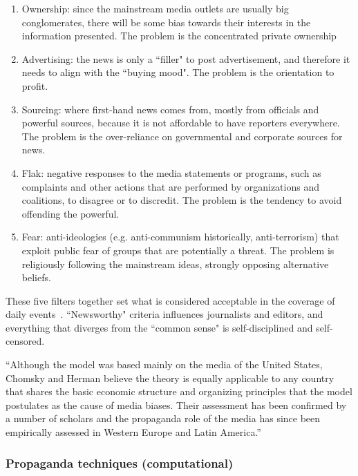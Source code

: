\begin{enumerate}
    \item Ownership: since the mainstream media outlets are usually big conglomerates, there will be some bias towards their interests in the information presented. The problem is the concentrated private ownership
    \item Advertising: the news is only a ``filler" to post advertisement, and therefore it needs to align with the ``buying mood". The problem is the orientation to profit.
    \item Sourcing: where first-hand news comes from, mostly from officials and powerful sources, because it is not affordable to have reporters everywhere. The problem is the over-reliance on governmental and corporate sources for news.
    \item Flak: negative responses to the media statements or programs, such as complaints and other actions that are performed by organizations and coalitions, to disagree or to discredit. The problem is the tendency to avoid offending the powerful.
    \item Fear: anti-ideologies (e.g. anti-communism historically, anti-terrorism) that exploit public fear of groups that are potentially a threat. The problem is religiously following the mainstream ideas, strongly opposing alternative beliefs.
\end{enumerate}

These five filters together set what is considered acceptable in the coverage of daily events~\citep{phillips2007left}. ``Newsworthy" criteria influences journalists and editors, and everything that diverges from the ``common sense" is self-disciplined and self-censored.

“Although the model was based mainly on the media of the United States, Chomsky and Herman believe the theory is equally applicable to any country that shares the basic economic structure and organizing principles that the model postulates as the cause of media biases. Their assessment has been confirmed by a number of scholars and the propaganda role of the media has since been empirically assessed in Western Europe and Latin America.”~\citep{herman1996propaganda}


\subsubsection{Propaganda techniques (computational)}


